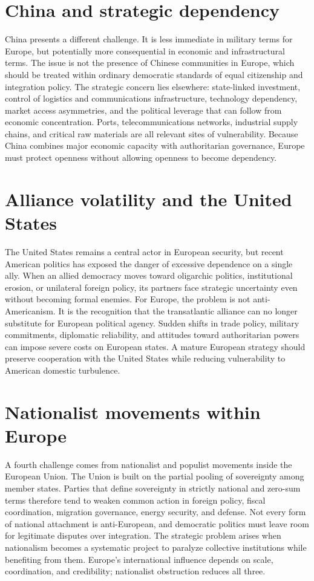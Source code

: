 \documentclass[11pt]{article}
\begin{document}
\section{China and strategic dependency}

China presents a different challenge. It is less immediate in military terms for Europe, but potentially more consequential in economic and infrastructural terms. The issue is not the presence of Chinese communities in Europe, which should be treated within ordinary democratic standards of equal citizenship and integration policy. The strategic concern lies elsewhere: state-linked investment, control of logistics and communications infrastructure, technology dependency, market access asymmetries, and the political leverage that can follow from economic concentration. Ports, telecommunications networks, industrial supply chains, and critical raw materials are all relevant sites of vulnerability. Because China combines major economic capacity with authoritarian governance, Europe must protect openness without allowing openness to become dependency.

\section{Alliance volatility and the United States}

The United States remains a central actor in European security, but recent American politics has exposed the danger of excessive dependence on a single ally. When an allied democracy moves toward oligarchic politics, institutional erosion, or unilateral foreign policy, its partners face strategic uncertainty even without becoming formal enemies. For Europe, the problem is not anti-Americanism. It is the recognition that the transatlantic alliance can no longer substitute for European political agency. Sudden shifts in trade policy, military commitments, diplomatic reliability, and attitudes toward authoritarian powers can impose severe costs on European states. A mature European strategy should preserve cooperation with the United States while reducing vulnerability to American domestic turbulence.

\section{Nationalist movements within Europe}

A fourth challenge comes from nationalist and populist movements inside the European Union. The Union is built on the partial pooling of sovereignty among member states. Parties that define sovereignty in strictly national and zero-sum terms therefore tend to weaken common action in foreign policy, fiscal coordination, migration governance, energy security, and defense. Not every form of national attachment is anti-European, and democratic politics must leave room for legitimate disputes over integration. The strategic problem arises when nationalism becomes a systematic project to paralyze collective institutions while benefiting from them. Europe's international influence depends on scale, coordination, and credibility; nationalist obstruction reduces all three.
\end{document}
